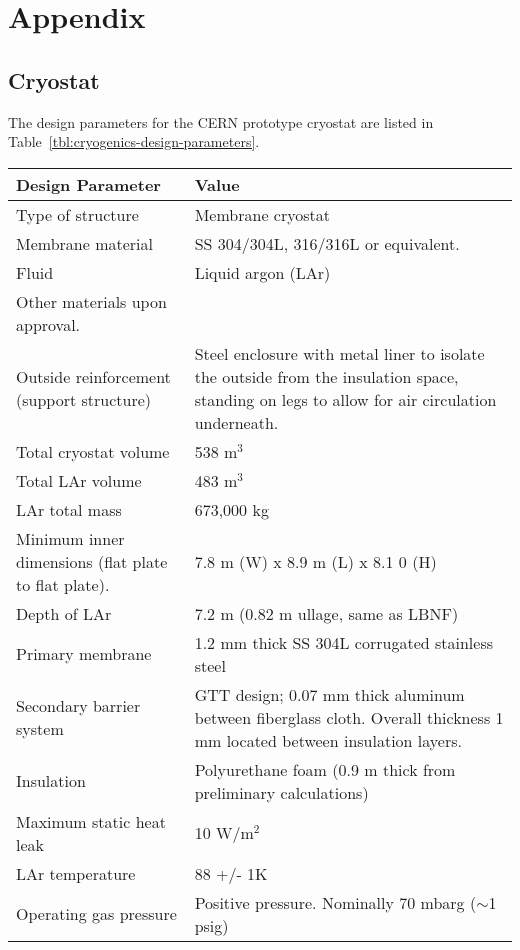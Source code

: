 \label{appendix}
\section*{Appendix}
\subsection*{Cryostat}

The design parameters for the CERN prototype cryostat are listed in Table~\ref{tbl:cryogenics-design-parameters}.

\begin{table}[htpb]
\centering
\begin{tabular}{|p{}|p{}|}
\hline
\textbf{Design Parameter} & \textbf{Value} \\ \hline
Type of structure & Membrane cryostat \\ \hline
Membrane material    &  SS 304/304L, 316/316L or equivalent. \\ \hline
Fluid & Liquid argon (LAr)  \\ \hline
Other materials upon approval.\\ \hline
 Outside reinforcement (support structure)  &  Steel enclosure with metal liner to isolate the outside from the insulation space, standing on legs to allow for air circulation underneath. \\ \hline
 Total cryostat volume  &  538 m$^3$ \\ \hline
 Total LAr volume  &  483 m$^3$ \\ \hline
LAr total mass   & 673,000 kg  \\ \hline
Minimum inner dimensions (flat plate to flat plate).   &  7.8 m (W) x 8.9 m (L) x 8.1 0 (H) \\ \hline
Depth of LAr   &  7.2 m (0.82 m ullage, same as LBNF) \\ \hline
Primary membrane   &   1.2 mm thick SS 304L corrugated stainless steel\\ \hline
Secondary barrier system   &  GTT design; 0.07 mm thick aluminum between fiberglass cloth. Overall thickness 1 mm located between insulation layers.  \\ \hline
 Insulation  &  Polyurethane foam (0.9 m thick from preliminary calculations) \\ \hline
Maximum static heat leak   &  10 W/m$^2$ \\ \hline
LAr temperature   & 88 +/- 1K  \\ \hline
Operating gas pressure   &  Positive pressure. Nominally 70 mbarg ($\sim$1 psig) \\ \hline

\end{tabular}
\end{table}

